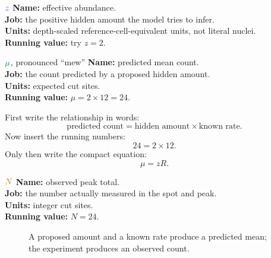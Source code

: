 \documentclass[11pt]{article}
\newcommand{\obsq}[1]{\textcolor{observedgold!80!black}{#1}}
\newcommand{\unknownq}[1]{\textcolor{unknownpurple}{#1}}
\newcommand{\calcq}[1]{\textcolor{calcteal!85!black}{#1}}
\begin{document}
\begin{newvar}{\(\unknownq{z}\)}
\textbf{Name:} effective abundance.\\
\textbf{Job:} the positive hidden amount the model tries to infer.\\
\textbf{Units:} depth-scaled reference-cell-equivalent units, not literal nuclei.\\
\textbf{Running value:} try \(z=2\).
\end{newvar}

\begin{newvar}{\(\calcq{\mu}\), pronounced “mew”}
\textbf{Name:} predicted mean count.\\
\textbf{Job:} the count predicted by a proposed hidden amount.\\
\textbf{Units:} expected cut sites.\\
\textbf{Running value:} \(\mu=2\times12=24\).
\end{newvar}

First write the relationship in words:
\[
\text{predicted count}
=
\text{hidden amount}
\times
\text{known rate}.
\]
Now insert the running numbers:
\[
24=2\times12.
\]
Only then write the compact equation:
\[
\boxed{\mu=zR.}
\]

\begin{newvar}{\(\obsq{N}\)}
\textbf{Name:} observed peak total.\\
\textbf{Job:} the number actually measured in the spot and peak.\\
\textbf{Units:} integer cut sites.\\
\textbf{Running value:} \(N=24\).
\end{newvar}

\begin{figure}[H]
\centering
{}
\caption{A proposed amount and a known rate produce a predicted mean; the experiment produces an observed count.}
\end{figure}
\end{document}
